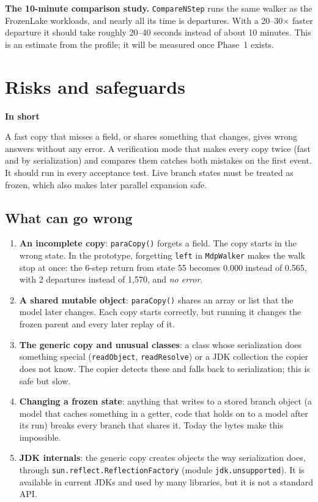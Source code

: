 \documentclass[11pt]{article}
\newcommand{\code}[1]{\texttt{#1}}
\newcommand{\shadedbox}[3]{\par\smallskip\noindent\colorbox{#1}{\parbox{\dimexpr\linewidth-2\fboxsep}{\textbf{#2}\par #3}}\par\smallskip}
\newcommand{\takeaway}[1]{\shadedbox{okbg}{In short}{#1}}
\begin{document}
\textbf{The 10-minute comparison study.} \code{CompareNStep} runs the same walker as the FrozenLake workloads, and
nearly all its time is departures. With a 20--30$\times$ faster departure it should take roughly 20--40 seconds
instead of about 10 minutes. This is an estimate from the profile; it will be measured once Phase~1 exists.

\section{Risks and safeguards}\label{sec:safety}

\takeaway{A fast copy that misses a field, or shares something that changes, gives wrong answers without any error.
A verification mode that makes every copy twice (fast and by serialization) and compares them catches both mistakes on
the first event. It should run in every acceptance test. Live branch states must be treated as frozen, which also
makes later parallel expansion safe.}

\subsection{What can go wrong}
\begin{enumerate}
\item \textbf{An incomplete copy}: \code{paraCopy()} forgets a field. The copy starts in the wrong state. In the
  prototype, forgetting \code{left} in \code{MdpWalker} makes the walk stop at once: the 6-step return from state 55
  becomes 0.000 instead of 0.565, with 2 departures instead of 1{,}570, and \emph{no error}.
\item \textbf{A shared mutable object}: \code{paraCopy()} shares an array or list that the model later changes.
  Each copy starts correctly, but running it changes the frozen parent and every later replay of it.
\item \textbf{The generic copy and unusual classes}: a class whose serialization does something special
  (\code{readObject}, \code{readResolve}) or a JDK collection the copier does not know. The copier detects these and
  falls back to serialization; this is safe but slow.
\item \textbf{Changing a frozen state}: anything that writes to a stored branch object (a model that caches something
  in a getter, code that holds on to a model after its run) breaks every branch that shares it. Today the bytes make
  this impossible.
\item \textbf{JDK internals}: the generic copy creates objects the way serialization does, through
  \code{sun.reflect.ReflectionFactory} (module \code{jdk.unsupported}). It is available in current JDKs and used by
  many libraries, but it is not a standard API.
\end{enumerate}
\end{document}

